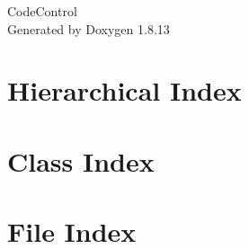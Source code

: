 \documentclass[twoside]{book}
\newcommand{\+}{\discretionary{\mbox{\scriptsize$\hookleftarrow$}}{}{}}
\newcommand{\clearemptydoublepage}{%
  \newpage{\pagestyle{empty}\cleardoublepage}%
}
\begin{document}
\hypersetup{pageanchor=false,
             bookmarksnumbered=true,
             pdfencoding=unicode
            }
\begin{titlepage}
\vspace*{7cm}
\begin{center}%
{\Large Code\+Control }\\
\vspace*{1cm}
{\large Generated by Doxygen 1.8.13}\\
\end{center}
\end{titlepage}
\clearemptydoublepage
{}
\tableofcontents
\clearemptydoublepage
{}
\hypersetup{pageanchor=true}

\chapter{Hierarchical Index}

\chapter{Class Index}

\chapter{File Index}

\end{document}
